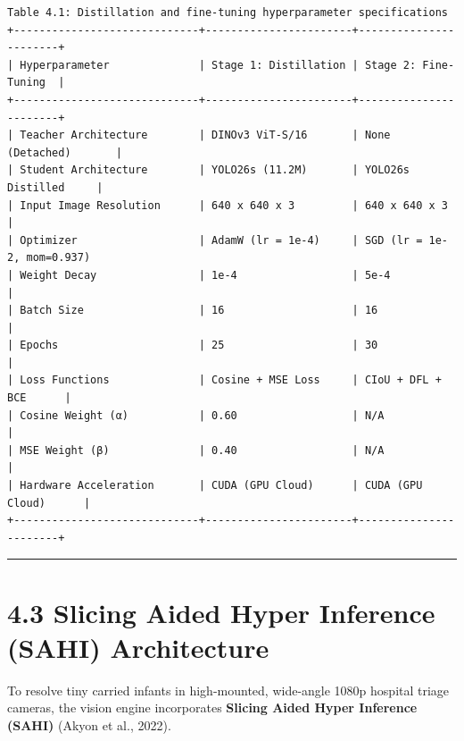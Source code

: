 \begin{verbatim}
Table 4.1: Distillation and fine-tuning hyperparameter specifications
+-----------------------------+-----------------------+-----------------------+
| Hyperparameter              | Stage 1: Distillation | Stage 2: Fine-Tuning  |
+-----------------------------+-----------------------+-----------------------+
| Teacher Architecture        | DINOv3 ViT-S/16       | None (Detached)       |
| Student Architecture        | YOLO26s (11.2M)       | YOLO26s Distilled     |
| Input Image Resolution      | 640 x 640 x 3         | 640 x 640 x 3         |
| Optimizer                   | AdamW (lr = 1e-4)     | SGD (lr = 1e-2, mom=0.937)
| Weight Decay                | 1e-4                  | 5e-4                  |
| Batch Size                  | 16                    | 16                    |
| Epochs                      | 25                    | 30                    |
| Loss Functions              | Cosine + MSE Loss     | CIoU + DFL + BCE      |
| Cosine Weight (α)           | 0.60                  | N/A                   |
| MSE Weight (β)              | 0.40                  | N/A                   |
| Hardware Acceleration       | CUDA (GPU Cloud)      | CUDA (GPU Cloud)      |
+-----------------------------+-----------------------+-----------------------+
\end{verbatim}

\begin{center}\rule{0.5\linewidth}{0.5pt}\end{center}

\section{4.3 Slicing Aided Hyper Inference (SAHI)
Architecture}\label{slicing-aided-hyper-inference-sahi-architecture}

To resolve tiny carried infants in high-mounted, wide-angle 1080p
hospital triage cameras, the vision engine incorporates \textbf{Slicing
Aided Hyper Inference (SAHI)} (Akyon et al., 2022).

